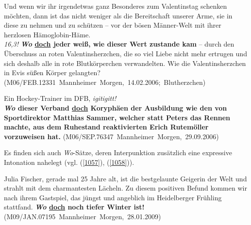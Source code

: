 {\begin{exe}
	\ex\label{1055} 
	\scriptsize
	Und wenn wir ihr irgendetwas ganz Besonderes zum Valentinstag schenken möchten, dann ist das nicht weniger als die Bereitschaft unserer Arme, sie in 		diese zu nehmen und zu schützen – vor der bösen Männer-Welt mit ihrer herzlosen Hämoglobin-Häme.\\
	\emph{16,3!} \textbf{\textit{Wo} \underline{doch} jeder weiß, wie dieser Wert zustande kam} – durch den Überschuss an roten Valentinsherzchen, die so 		viel Liebe nicht mehr ertrugen und sich deshalb alle in rote Blutkörperchen verwandelten. Wie die Valentinsherzchen in Evis süßen Körper gelangten? 
	\newline              		
	\hbox{}\hfill\hbox {(M06/FEB.12331 Mannheimer Morgen, 14.02.2006; Blutherzchen)}
\end{exe}

\begin{exe}
	\ex\label{1056} 
	\scriptsize
	Ein Hockey-Trainer im DFB, \emph{igitigitt!}\\
	\textbf{\textit{Wo} dieser Verband \underline{doch} Koryphäen der Ausbildung wie den von Sportdirektor Matthias Sammer, welcher statt Peters das Rennen 	machte, aus dem Ruhestand reaktivierten Erich Rutemöller vorzuweisen hat.}   
	\hfill\hbox {(M06/SEP.76347 Mannheimer Morgen, 29.09.2006)}
\end{exe}
Es finden sich auch \textit{Wo}-Sätze, deren Interpunktion zusätzlich eine expressive Intonation nahelegt (vgl. (\ref{1057}), (\ref{1058})).

\begin{exe}
	\ex\label{1057} 
	\scriptsize
	Julia Fischer, gerade mal 25 Jahre alt, ist die bestgelaunte Geigerin der Welt und strahlt mit dem charmantesten Lächeln. Zu diesem positiven Befund 		kommen wir nach ihrem Gastspiel, das jüngst und angeblich im Heidelberger Frühling stattfand. \textbf{\textit{Wo} \underline{doch} noch tiefer Winter 		ist!} 	  
	\newline              		
	\hbox{}\hfill\hbox {(M09/JAN.07195 Mannheimer Morgen, 28.01.2009)}
\end{exe}

}
